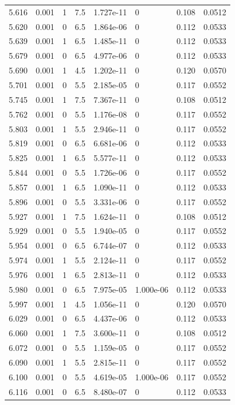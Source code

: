 \documentclass[preview]{standalone}
\begin{document}
{{{{{{\begin{tabular}{L{1.2cm}C{1.2cm} C{0.3cm}C{0.5cm} C{1.4cm}C{1.4cm} C{1.4cm}C{1.4cm}}
  5.616  &  0.001  & 1     & 7.5 &  1.727e-11  & 0  & 0.108 &  0.0512   \\ 
  5.620  &  0.001  & 0     & 6.5 &  1.864e-06  & 0  & 0.112 &  0.0533   \\ 
  5.639  &  0.001  & 1     & 6.5 &  1.485e-11  & 0  & 0.112 &  0.0533   \\ 
  5.679  &  0.001  & 0     & 6.5 &  4.977e-06  & 0  & 0.112 &  0.0533   \\ 
  5.690  &  0.001  & 1     & 4.5 &  1.202e-11  & 0  & 0.120 &  0.0570   \\ 
  5.701  &  0.001  & 0     & 5.5 &  2.185e-05  & 0  & 0.117 &  0.0552   \\ 
  5.745  &  0.001  & 1     & 7.5 &  7.367e-11  & 0  & 0.108 &  0.0512   \\ 
  5.762  &  0.001  & 0     & 5.5 &  1.176e-08  & 0  & 0.117 &  0.0552   \\ 
  5.803  &  0.001  & 1     & 5.5 &  2.946e-11  & 0  & 0.117 &  0.0552   \\ 
  5.819  &  0.001  & 0     & 6.5 &  6.681e-06  & 0  & 0.112 &  0.0533   \\ 
  5.825  &  0.001  & 1     & 6.5 &  5.577e-11  & 0  & 0.112 &  0.0533   \\ 
  5.844  &  0.001  & 0     & 5.5 &  1.726e-06  & 0  & 0.117 &  0.0552   \\ 
  5.857  &  0.001  & 1     & 6.5 &  1.090e-11  & 0  & 0.112 &  0.0533   \\ 
  5.896  &  0.001  & 0     & 5.5 &  3.331e-06  & 0  & 0.117 &  0.0552   \\ 
  5.927  &  0.001  & 1     & 7.5 &  1.624e-11  & 0  & 0.108 &  0.0512   \\ 
  5.929  &  0.001  & 0     & 5.5 &  1.940e-05  & 0  & 0.117 &  0.0552   \\ 
  5.954  &  0.001  & 0     & 6.5 &  6.744e-07  & 0  & 0.112 &  0.0533   \\ 
  5.974  &  0.001  & 1     & 5.5 &  2.124e-11  & 0  & 0.117 &  0.0552   \\ 
  5.976  &  0.001  & 1     & 6.5 &  2.813e-11  & 0  & 0.112 &  0.0533   \\ 
  5.980  &  0.001  & 0     & 6.5 &  7.975e-05  & 1.000e-06  & 0.112 &  0.0533   \\ 
  5.997  &  0.001  & 1     & 4.5 &  1.056e-11  & 0  & 0.120 &  0.0570   \\ 
  6.029  &  0.001  & 0     & 6.5 &  4.437e-06  & 0  & 0.112 &  0.0533   \\ 
  6.060  &  0.001  & 1     & 7.5 &  3.600e-11  & 0  & 0.108 &  0.0512   \\ 
  6.072  &  0.001  & 0     & 5.5 &  1.159e-05  & 0  & 0.117 &  0.0552   \\ 
  6.090  &  0.001  & 1     & 5.5 &  2.815e-11  & 0  & 0.117 &  0.0552   \\ 
  6.100  &  0.001  & 0     & 5.5 &  4.619e-05  & 1.000e-06  & 0.117 &  0.0552   \\ 
  6.116  &  0.001  & 0     & 6.5 &  8.480e-07  & 0  & 0.112 &  0.0533   \\ 
\hline 
\end{tabular} 

}}}}}}
\end{document}
